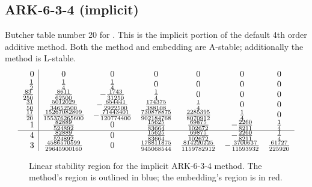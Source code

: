 \documentclass[letterpaper,10pt,english]{sphinxmanual}
\begin{document}
\subsection{ARK-6-3-4 (implicit)}
\label{Butcher:ark-6-3-4-implicit}\label{Butcher:butcher-ark-6-3-4-i}
Butcher table number 20
for {\hyperref[c_interface/User_callable:ARKodeSetIRKTableNum]{}}.  This is
the implicit portion of the default 4th order additive method.  Both
the method and embedding are A-stable; additionally the method is
L-stable.
\begin{gather}
\begin{split}\begin{array}{r|cccccc}
  0 & 0 & 0 & 0 & 0 & 0 & 0 \\
  \frac{1}{2} & \frac{1}{4} & \frac{1}{4} & 0 & 0 & 0 & 0 \\
  \frac{83}{250} & \frac{8611}{62500} & -\frac{1743}{31250} & \frac{1}{4} & 0 & 0 & 0 \\
  \frac{31}{50} & \frac{5012029}{34652500} & -\frac{654441}{2922500} & \frac{174375}{388108} & \frac{1}{4} & 0 & 0 \\
  \frac{17}{20} & \frac{15267082809}{155376265600} & -\frac{71443401}{120774400} & \frac{730878875}{902184768} & \frac{2285395}{8070912} & \frac{1}{4} & 0 \\
  1 & \frac{82889}{524892} & 0 & \frac{15625}{83664} & \frac{69875}{102672} & -\frac{2260}{8211} & \frac{1}{4} \\
  \hline
  4 & \frac{82889}{524892} & 0 & \frac{15625}{83664} & \frac{69875}{102672} & -\frac{2260}{8211} & \frac{1}{4} \\
  3 & \frac{4586570599}{29645900160} & 0 & \frac{178811875}{945068544} & \frac{814220225}{1159782912} & -\frac{3700637}{11593932} & \frac{61727}{225920}
\end{array}\end{split}\notag
\end{gather}\begin{figure}[htbp]
\centering
\capstart

\caption{Linear stability region for the implicit ARK-6-3-4 method.  The method's
region is outlined in blue; the embedding's region is in red.}\end{figure}
\end{document}
